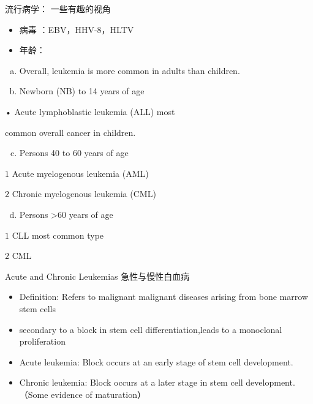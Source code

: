 \documentclass[
  ignorenonframetext,
]{beamer}
\providecommand{\tightlist}{%
  \setlength{\itemsep}{0pt}\setlength{\parskip}{0pt}}
\begin{document}
\begin{frame}
\begin{block}{流行病学： 一些有趣的视角}
\protect\hypertarget{ux6d41ux884cux75c5ux5b66-ux4e00ux4e9bux6709ux8da3ux7684ux89c6ux89d2}{}
\begin{itemize}
\item
  病毒 ：EBV，HHV-8，HLTV
\item
  年龄：
\end{itemize}

\begin{enumerate}
[a.]
\item
  Overall, leukemia is more common in adults than children.
\item
  Newborn (NB) to 14 years of age
\end{enumerate}

• Acute lymphoblastic leukemia (ALL) most

common overall cancer in children.

\begin{enumerate}
[a.]
\setcounter{enumi}{2}
\tightlist
\item
  Persons 40 to 60 years of age
\end{enumerate}

\(1\) Acute myelogenous leukemia (AML)

\(2\) Chronic myelogenous leukemia (CML)

\begin{enumerate}
[a.]
\setcounter{enumi}{3}
\tightlist
\item
  Persons \textgreater60 years of age
\end{enumerate}

\(1\) CLL most common type

\(2\) CML
\end{block}
\end{frame}

\begin{frame}
\begin{block}{Acute and Chronic Leukemias 急性与慢性白血病}
\protect\hypertarget{acute-and-chronic-leukemias-ux6025ux6027ux4e0eux6162ux6027ux767dux8840ux75c5}{}
\begin{itemize}
\item
  Definition: Refers to malignant malignant diseases arising from bone
  marrow stem cells
\item
  secondary to a block in stem cell differentiation,leads to a
  monoclonal proliferation
\item
  Acute leukemia: Block occurs at an early stage of stem cell
  development.
\item
  Chronic leukemia: Block occurs at a later stage in stem cell
  development.（Some evidence of maturation）
\end{itemize}
\end{block}
\end{frame}
\end{document}
